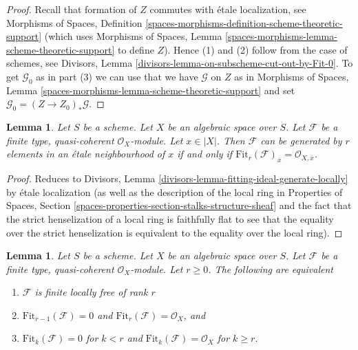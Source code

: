 \documentclass{stacks-project}
\theoremstyle{plain}
\newtheorem{lemma}[subsection]{Lemma}
\theoremstyle{definition}
\theoremstyle{remark}
\numberwithin{equation}{subsection}
\begin{document}
\begin{proof}
Recall that formation of $Z$ commutes with \'etale localization, see
Morphisms of Spaces, Definition
\ref{spaces-morphisms-definition-scheme-theoretic-support}
(which uses Morphisms of Spaces, Lemma
\ref{spaces-morphisms-lemma-scheme-theoretic-support}
to define $Z$). Hence (1) and (2) follow from the case of schemes, see
Divisors, Lemma \ref{divisors-lemma-on-subscheme-cut-out-by-Fit-0}.
To get $\mathcal{G}_0$ as in part (3) we can use
that we have $\mathcal{G}$ on $Z$ as in Morphisms of Spaces, Lemma
\ref{spaces-morphisms-lemma-scheme-theoretic-support}
and set $\mathcal{G}_0 = (Z \to Z_0)_*\mathcal{G}$.
\end{proof}

\begin{lemma}
\label{lemma-fitting-ideal-generate-locally}
Let $S$ be a scheme. Let $X$ be an algebraic space over $S$.
Let $\mathcal{F}$ be a finite type, quasi-coherent
$\mathcal{O}_X$-module. Let $x \in |X|$. Then $\mathcal{F}$ can be
generated by $r$ elements in an \'etale neighbourhood of $x$ if and only
if $\text{Fit}_r(\mathcal{F})_{\overline{x}} = \mathcal{O}_{X, \overline{x}}$.
\end{lemma}

\begin{proof}
Reduces to
Divisors, Lemma \ref{divisors-lemma-fitting-ideal-generate-locally}
by \'etale localization (as well as the description of the local
ring in Properties of Spaces, Section
\ref{spaces-properties-section-stalks-structure-sheaf}
and the fact that the strict henselization of a local ring
is faithfully flat to see that the equality over the strict
henselization is equivalent to the equality over the local ring).
\end{proof}

\begin{lemma}
\label{lemma-fitting-ideal-finite-locally-free}
Let $S$ be a scheme. Let $X$ be an algebraic space over $S$.
Let $\mathcal{F}$ be a finite type, quasi-coherent
$\mathcal{O}_X$-module. Let $r \geq 0$. The following are equivalent
\begin{enumerate}
\item $\mathcal{F}$ is finite locally free of rank $r$
\item $\text{Fit}_{r - 1}(\mathcal{F}) = 0$ and
$\text{Fit}_r(\mathcal{F}) = \mathcal{O}_X$, and
\item $\text{Fit}_k(\mathcal{F}) = 0$ for $k < r$ and
$\text{Fit}_k(\mathcal{F}) = \mathcal{O}_X$ for $k \geq r$.
\end{enumerate}
\end{lemma}
\end{document}
